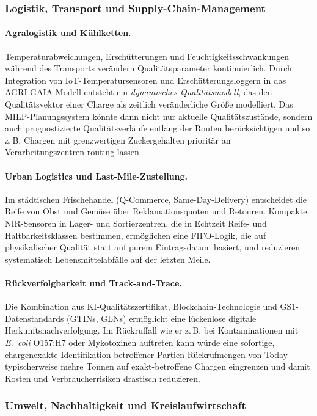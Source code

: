 \documentclass[a4paper, 12pt, twoside, openright]{report}
\theoremstyle{definition}
\theoremstyle{definition}
\begin{document}
\subsubsection{Logistik, Transport und Supply-Chain-Management}

\paragraph{Agralogistik und Kühlketten.}
Temperaturabweichungen, Erschütterungen und Feuchtigkeitsschwankungen
während des Transports verändern Qualitätsparameter kontinuierlich.
Durch Integration von IoT-Temperatursensoren und Erschütterungsloggern
in das AGRI-GAIA-Modell entsteht ein \emph{dynamisches Qualitätsmodell},
das den Qualitätsvektor einer Charge als zeitlich veränderliche Größe
modelliert. Das MILP-Planungssystem könnte dann nicht nur aktuelle
Qualitätszustände, sondern auch prognostizierte Qualitätsverläufe
entlang der Routen berücksichtigen und so z.\,B. Chargen mit
grenzwertigen Zuckergehalten prioritär an Verarbeitungszentren
routing lassen.

\paragraph{Urban Logistics und Last-Mile-Zustellung.}
Im städtischen Frischehandel (Q-Com\-merce, Same-Day-Delivery) entscheidet
die Reife von Obst und Gemüse über Reklamationsquoten und Retouren.
Kompakte NIR-Sensoren in Lager- und Sortierzentren, die in Echtzeit
Reife- und Haltbarkeitsklassen bestimmen, ermöglichen eine
FIFO-Logik, die auf physikalischer Qualität statt auf purem
Eintragsdatum basiert, und reduzieren systematisch Lebensmittelabfälle
auf der letzten Meile.

\paragraph{Rückverfolgbarkeit und Track-and-Trace.}
Die Kombination aus KI-Qualitätszertifi\-kat, Blockchain-Technologie
und GS1-Datenstandards (GTINs, GLNs) ermöglicht eine lückenlose
digitale Herkunftsnachverfolgung. Im Rückruffall wie er z.\,B.
bei Kontaminationen mit \textit{E.\ coli} O157:H7 oder Mykotoxinen
auftreten kann würde eine sofortige, chargenexakte Identifikation
betroffener Partien Rückrufmengen von Today typischerweise mehre Tonnen
auf exakt-betroffene Chargen eingrenzen und damit Kosten und
Verbraucherrisiken drastisch reduzieren.

\subsubsection{Umwelt, Nachhaltigkeit und Kreislaufwirtschaft}
\end{document}

